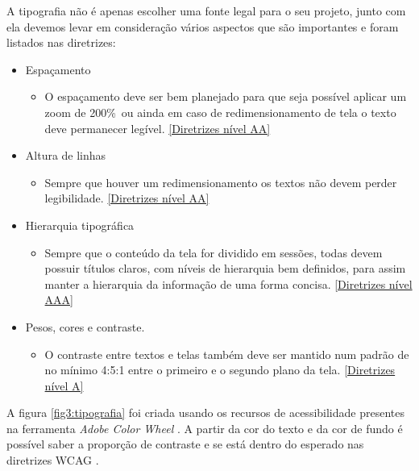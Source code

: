 {A tipografia não é apenas escolher uma fonte legal para o seu projeto, junto com ela devemos levar em consideração vários aspectos que são importantes e foram listados nas diretrizes: 
\begin{itemize}
    \item Espaçamento
    \begin{itemize}
        \item O espaçamento deve ser bem planejado para que seja possível aplicar um zoom de 200\%\ ou ainda em caso de redimensionamento de tela o texto deve permanecer legível. \ref{Diretrizes nível AA}
    \end{itemize}
    \item Altura de linhas
    \begin{itemize}
        \item Sempre que houver um redimensionamento os textos não devem perder legibilidade. \ref{Diretrizes nível AA}
    \end{itemize}
    \item Hierarquia tipográfica
    \begin{itemize}
        \item Sempre que o conteúdo da tela for dividido em sessões, todas devem possuir títulos claros, com níveis de hierarquia bem definidos, para assim manter a hierarquia da informação de uma forma concisa. \ref{Diretrizes nível AAA}
    \end{itemize}
    \item Pesos, cores e contraste. 
    \begin{itemize}
        \item O contraste entre textos e telas também deve ser mantido num padrão de no mínimo 4:5:1 entre o primeiro e o segundo plano da tela. \ref{Diretrizes nível A}
    \end{itemize}
\end{itemize}

A figura \ref{fig3:tipografia} foi criada usando os recursos de acessibilidade presentes na ferramenta \textit{Adobe Color Wheel} \cite{ADOBE}. A partir da cor do texto e da cor de fundo é possível saber a proporção de contraste e se está dentro do esperado nas diretrizes WCAG \cite{WCAG20}.

}
